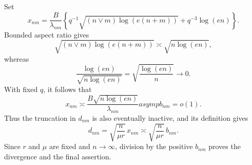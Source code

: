 Set
\[
 x_{nm}=\frac B{\lambda_{nm}}
 \left\{q^{-1}\sqrt{(n\vee m)\log(e(n+m))}
 +q^{-3}\log(en)\right\}.
\]
Bounded aspect ratio gives
\[
 \sqrt{(n\vee m)\log(e(n+m))}\asymp\sqrt{n\log(en)},
\]
whereas
\[
 \frac{\log(en)}{\sqrt{n\log(en)}}
 =\sqrt{\frac{\log(en)}n}\longrightarrow0.
\]
With fixed \(q\), it follows that
\[
 x_{nm}\asymp\frac{B\sqrt{n\log(en)}}{\lambda_{nm}}asymp b_{nm}=o(1).
\]
Thus the truncation in \(d_{nm}\) is also eventually inactive, and its definition gives
\[
 d_{nm}=\sqrt{\frac n{\mu r}}\,x_{nm}
 \asymp\sqrt{\frac n{\mu r}}\,b_{nm}.
\]
Since \(r\) and \(\mu\) are fixed and \(n\to\infty\), division by the positive \(b_{nm}\) proves the divergence and the final assertion.
